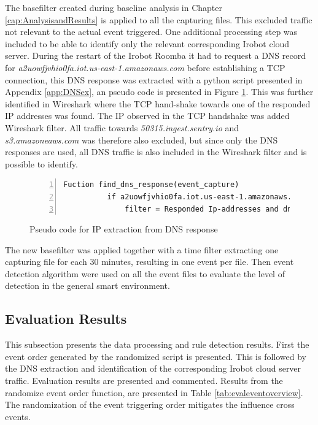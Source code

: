 The basefilter created during baseline analysis in Chapter \ref{cap:AnalysisandResults} is applied to all the capturing files. This excluded traffic not relevant to the actual event triggered. One additional processing step was included to be able to identify only the relevant corresponding Irobot cloud server. During the restart of the Irobot Roomba it had to request a DNS record for \textit{a2uowfjvhio0fa.iot.us-east-1.amazonaws.com} before establishing a TCP connection, this DNS response was extracted with a python script presented in Appendix \ref{app:DNSex}, an pseudo code is presented in Figure \ref{fig:Sudo_code_for_IP_extraction_from_DNS_response}. This was further identified in Wireshark where the TCP hand-shake towards one of the responded IP addresses was found. The IP observed in the TCP handshake was added Wireshark filter. All traffic towards \textit{50315.ingest.sentry.io} and \textit{s3.amazoneaws.com} was therefore also excluded, but since only the DNS responses are used, all DNS traffic is also included in the Wireshark filter and is possible to identify.  

\begin{figure}[H]
    \centering
    \caption{Pseudo code for IP extraction from DNS response}
    \label{fig:Sudo_code_for_IP_extraction_from_DNS_response}
    \begin{lstlisting}[numbers=left]
        Fuction find_dns_response(event_capture)
          if a2uowfjvhio0fa.iot.us-east-1.amazonaws.com in event_capture
              filter = Responded Ip-addresses and dns
    \end{lstlisting}
 \end{figure}   
 
The new basefilter was applied together with a time filter extracting one capturing file for each 30 minutes, resulting in one event per file. Then event detection algorithm were used on all the event files to evaluate the level of detection in the general smart environment.  

\subsection{Evaluation Results}

This subsection presents the data processing and rule detection results. First the event order generated by the randomized script is presented. This is followed by the DNS extraction and identification of the corresponding Irobot cloud server traffic. Evaluation results are presented and commented. 
Results from the randomize event order function, are presented in Table \ref{tab:evaleventoverview}. The randomization of the event triggering order mitigates the influence cross events. 

